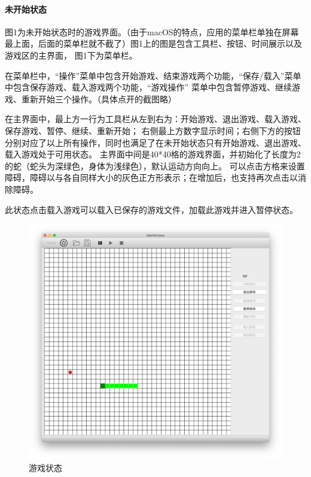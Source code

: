 \documentclass[utf-8]{ctexart}
\begin{document}
    \paragraph{未开始状态} 图1为未开始状态时的游戏界面。（由于macOS的特点，应用的菜单栏单独在屏幕最上面，后面的菜单栏就不截了）图1上的图是包含工具栏、按钮、时间展示以及游戏区的主界面，
    图1下为菜单栏。\par 在菜单栏中，“操作”菜单中包含开始游戏、结束游戏两个功能，“保存/载入”菜单中包含保存游戏、载入游戏两个功能，“游戏操作”
    菜单中包含暂停游戏、继续游戏、重新开始三个操作。（具体点开的截图略）
    \par 在主界面中，最上方一行为工具栏从左到右为：开始游戏、退出游戏、载入游戏、保存游戏、暂停、继续、重新开始；
    右侧最上方数字显示时间；右侧下方的按钮分别对应了以上所有操作，同时也满足了在未开始状态只有开始游戏、退出游戏、载入游戏处于可用状态。
    主界面中间是40*40格的游戏界面，并初始化了长度为2的蛇（蛇头为深绿色，身体为浅绿色），默认运动方向向上。
    可以点击方格来设置障碍，障碍以与各自同样大小的灰色正方形表示；在增加后，也支持再次点击以消除障碍。
    \par 此状态点击载入游戏可以载入已保存的游戏文件，加载此游戏并进入暂停状态。

    \begin{figure}[H]
        \centering
        \includegraphics[scale = 0.2]{texsrc/开始游戏.png}
        \caption{游戏状态}
        \label{gaming}
    \end{figure}
\end{document}
